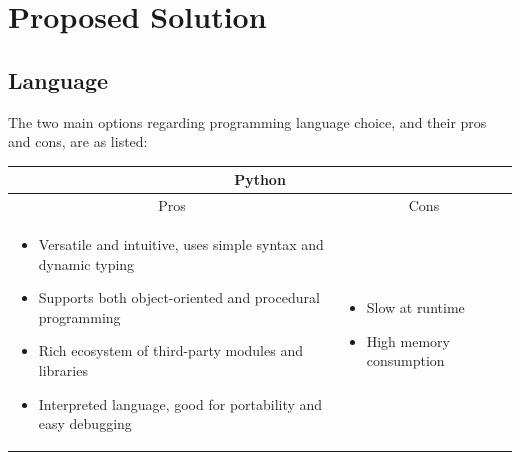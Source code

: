 \documentclass[../main/main.tex]{subfiles}
\begin{document}
\section{Proposed Solution}
\subsection{Language}
The two main options regarding programming language choice, and their pros and cons, are as listed:

\begin{longtable}{ll}
    \toprule
    \multicolumn{2}{c}{Python}\\
    \midrule
    \multicolumn{1}{c}{Pros} & \multicolumn{1}{c}{Cons}\\
    \midrule

    \parbox[t][][t]{0.5\textwidth}{
        \begin{itemize}
            \item Versatile and intuitive, uses simple syntax and dynamic typing
            \item Supports both object-oriented and procedural programming
            \item Rich ecosystem of third-party modules and libraries
            \item Interpreted language, good for portability and easy debugging
        \end{itemize}
    } & \parbox[t][][t]{0.5\textwidth}{
        \begin{itemize}
            \item Slow at runtime
            \item High memory consumption
        \end{itemize}
    }
    \\
    \bottomrule
\end{longtable}
\end{document}
